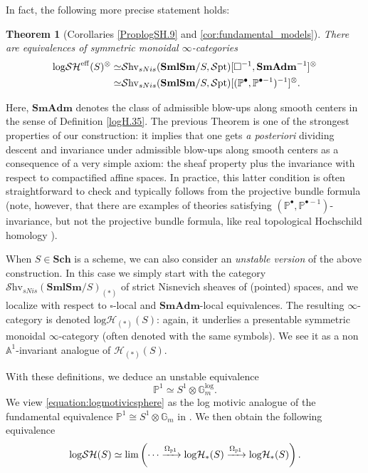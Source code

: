 \documentclass[11pt, a4paper]{amsart}
\newtheorem{thm}{Theorem}[subsection]
\theoremstyle{definition}
\numberwithin{equation}{subsection}
\renewcommand{\P}{\mathbb{P}}
\newcommand{\Sch}{\mathbf{Sch}}
\newcommand{\SmlSm}{\mathbf{SmlSm}}
\newcommand{\SmAdm}{\mathbf{SmAdm}}
\newcommand{\boxx}{\square}
\newcommand{\Gmm}{\mathbb{G}_m^{\mathrm{log}}}
\newcommand{\eff}{{\rm eff}}
\newcommand{\infShv}{\mathcal{S}\mathrm{hv}}
\newcommand{\infSpt}{\mathcal{S}\mathrm{pt}}
\newcommand{\inflogH}{\mathrm{log}\mathcal{H}}
\newcommand{\inflogSH}{\mathrm{log}\mathcal{SH}}
\begin{document}
In fact, the following more precise statement holds:
\begin{thm}[Corollaries \ref{ProplogSH.9} and \ref{cor:fundamental_models}]
There are equivalences of symmetric monoidal $\infty$-categories
\begin{align*}
\inflogSH^\eff(S)^\otimes
\simeq &
\infShv_{sNis}(\SmlSm/S,\infSpt)[\square^{-1},\SmAdm^{-1}]^\otimes
\\
\simeq &
\infShv_{sNis}(\SmlSm/S,\infSpt)
[(\P^\bullet,\P^{\bullet-1})^{-1}]^\otimes.
\end{align*}
\end{thm}

 Here, $\SmAdm$ denotes the class of admissible blow-ups along smooth centers in the sense of Definition \ref{logH.35}.
 The previous Theorem is one of the strongest properties of our construction: it implies that one gets \emph{a posteriori} dividing descent and invariance under admissible blow-ups along smooth centers as a consequence of a very simple axiom: the sheaf property plus the invariance with respect to compactified affine spaces. In practice, this latter condition is often straightforward to check and typically follows from the projective bundle formula (note, however, that there are examples of theories satisfying $(\P^\bullet,\P^{\bullet -1})$-invariance, but not the projective bundle formula, like real topological Hochschild homology \cite{2305.04150}). 
 



When $S\in \Sch$ is a scheme, we can also consider an \emph{unstable version} of the above construction. In this case we simply start with the category $\infShv_{sNis}(\SmlSm/S)_{(\ast)}$ of strict Nisnevich sheaves of (pointed) spaces, and we localize with respect to $\boxx$-local and $\SmAdm$-local equivalences. The resulting $\infty$-category is denoted $\inflogH_{(\ast)}(S)$: 
again, it underlies a presentable symmetric monoidal $\infty$-category (often denoted with the same symbols). 
We see it as a non $\mathbb{A}^1$-invariant analogue of $\mathcal{H}_{(\ast)}(S)$. 

With these definitions, 
we deduce an unstable equivalence 
\begin{equation}
\label{equation:logmotivicsphere}
\P^1
\simeq
S^{1}\otimes\Gmm.
\end{equation}
We view \eqref{equation:logmotivicsphere} as the log motivic analogue of the 
fundamental equivalence $\P^{1}\cong S^{1}\otimes \mathbb{G}_{m}$ in \cite{MV}.  We then obtain the following equivalence
\begin{equation}
\inflogSH(S)
\simeq\textup{lim}
\left(\cdots\xrightarrow{\Omega_{\mathbb{P}^{1}}}
\inflogH_{\ast}(S)\xrightarrow{\Omega_{\mathbb{P}^{1}}}
\inflogH_{\ast}(S)\right).
\end{equation}
\end{document}
